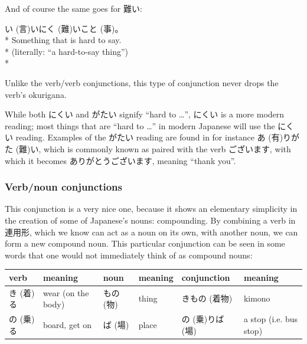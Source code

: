 \documentclass[11pt, b5paper, twoside, openright, onecolumn]{book}
\makeatletter
\newcommand*{\rtrubystack}[2]{{\relscale{0.5}%
  \begin{tabular}[b]{@{}c@{}}%
    {#1}\\%
    {\textscale{2}{#2}}%
  \end{tabular}}%
}
\DeclareRobustCommand*{\rtruby}[2]{%
  \mbox{%
    \setlength{\parskip}{0ex}%
    \BeginAccSupp{method=pdfstringdef,ActualText={#1}}%
      \rtrubystack{\phantom{#2}}{#1}%
      \llap{%
        \rtrubystack{#2}{\phantom{#1}}%
      }%
    \EndAccSupp{}%
  }%
}
\newcommand*{\rubystack}[2]{{\relscale{0.5}%
  \begin{tabular}[b]{@{}c@{}}%
    {#1}\\%
   {\textscale{2}{#2}}%
  \end{tabular}}%
}
\DeclareRobustCommand*{\ruby}[2]{%
  \mbox{%
    \setlength{\parskip}{0ex}%
    \BeginAccSupp{method=pdfstringdef,ActualText={#1}}%
      \rubystack{\phantom{#2}}{#1}%
      \llap{%
        \rubystack{#2}{\phantom{#1}}%
      }%
    \EndAccSupp{}%
  }%
}
\renewcommand*{\rtruby}[2]{#2 (#1)}%
\renewcommand*{\ruby}[2]{#2 (#1)}%
\newenvironment{exampleblock}{
\setlength{\parindent}{0.6in}
\begin{minipage}[t]{\dimexpr\textwidth-\parindent}}
{\end{minipage}}
\newenvironment{mytabularcentered}[1]{\noindent
\begin{center}\begin{tabular}[h]{#1}}{\end{tabular}\end{center}}
\makeatother
\begin{document}
And of course the same goes for 難い:

\vspace{0.4cm}
\begin{exampleblock}
\ruby{言}{い}い\ruby{難}{にく}い\ruby{事}{こと}。 \\* 
Something that is hard to say. \\* 
(literally: “a hard-to-say thing”) \\* 
\end{exampleblock}
\vspace{0.2cm}

Unlike the verb/verb conjunctions‚ this type of conjunction never drops the verb’s okurigana.

While both にくい and がたい signify “hard to …”‚ にくい is a more modern reading; most things that are “hard to …” in modern Japanese will use the にくい reading. Examples of the がたい reading are found in for instance \ruby{有}{あ}り\ruby{難}{がた}い‚ which is commonly known as paired with the verb ございます‚ with which it becomes ありがとうございます‚ meaning “thank you”.

\subsubsection{Verb/noun conjunctions}

This conjunction is a very nice one‚ because it shows an elementary simplicity in the creation of some of Japanese’s nouns: compounding. By combining a verb in 連用形‚ which we know can act as a noun on its own‚ with another noun‚ we can form a new compound noun. This particular conjunction can be seen in some words that one would not immediately think of as compound nouns:

\vspace{0.5cm}
\smaller
\begin{center}
\begin{mytabularcentered}{| l  l  l  l  l  l |}\hline 
\rule{0pt}{2.4ex}verb & meaning & noun & meaning & conjunction & meaning\\ 
\hline
\rule{0pt}{3.6ex}\rtruby{着}{き}る & wear (on the body) & \rtruby{物}{もの} & thing & \rtruby{着物}{きもの} & kimono\\ 
\rule{0pt}{3.6ex}\rtruby{乗}{の}る & board‚ get on & \rtruby{場}{ば} & place & \rtruby{乗}{の}り\rtruby{場}{ば} & a stop (i.e. bus stop)\\ 
\hline 
\end{mytabularcentered}
\end{center}
\larger
\end{document}
